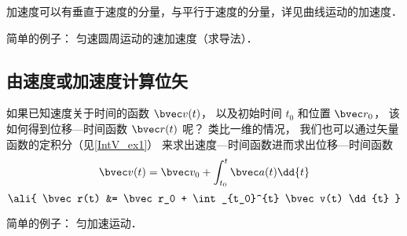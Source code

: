 加速度可以有垂直于速度的分量，与平行于速度的分量，详见曲线运动的加速度．

简单的例子： 匀速圆周运动的速加速度（求导法）．

\subsection{由速度或加速度计算位矢}

如果已知速度关于时间的函数 $\bvec v(t)$， 以及初始时间 $t_0$ 和位置 $\bvec r_0$， 该如何得到位移—时间函数 $\bvec r(t)$ 呢？ 类比一维的情况， 我们也可以通过矢量函数的定积分（见\autoref{IntV_ex1}） 来求出速度—时间函数进而求出位移—时间函数
\begin{equation}\label{VnA_eq7}
\bvec v(t) = \bvec v_0 + \int_{t_0}^{t} \bvec a(t) \dd{t}
\end{equation}
\begin{equation}\label{VnA_eq8}\ali{
\bvec r(t) &= \bvec r_0 + \int_{t_0}^{t} \bvec v(t) \dd{t}
}\end{equation}

简单的例子： 匀加速运动．
